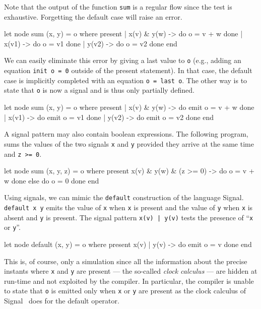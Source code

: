 \documentclass[11pt,titlepage,twoside]{report}
\newcommand{\signal}{{\sf Signal}}
\begin{document}
Note that the output of the function \verb-sum- is a regular flow
since the test is exhaustive. Forgetting the default case will raise
an error.
\begin{runverbatim}
let node sum (x, y) = o where
  present
  | x(v) & y(w) -> do o = v + w done
  | x(v1) -> do o = v1 done
  | y(v2) -> do o = v2 done
  end
\end{runverbatim}

We can easily eliminate this error by giving a last value to \verb-o-
(e.g., adding an equation \verb-init o = 0- outside of the present
statement). In that case, the default case is implicitly completed
with an equation \verb-o = last o-. The other way is to state that
\verb-o- is now a signal and is thus only partially defined.
\begin{runverbatim}[withresult]
let node sum (x, y) = o where
  present
  | x(v) & y(w) -> do emit o = v + w done
  | x(v1) -> do emit o = v1 done
  | y(v2) -> do emit o = v2 done
  end
\end{runverbatim}

A signal pattern may also contain boolean expressions. The following
program, sums the values of the two signals \verb-x- and \verb-y-
provided they arrive at the same time and \verb-z >= 0-.
\begin{runverbatim}
let node sum (x, y, z) = o where
  present
    x(v) & y(w) & (z >= 0) -> do o = v + w done
  else do o = 0 done
  end
\end{runverbatim}

\medskip{} Using signals, we can mimic the
\verb-default- construction of the language
\signal. \verb-default x y- emits the value of \verb-x- when \verb-x-
is present and the value of \verb-y- when \verb-x- is absent and
\verb-y- is present. The signal pattern \verb+x(v) | y(v)+ tests the
presence of ``\verb-x- or \verb-y-''.
\begin{runverbatim}
let node default (x, y) = o where
  present
    x(v) | y(v) -> do emit o = v done
  end
\end{runverbatim}
This is, of course, only a simulation since all the information about
the precise instants where \verb-x- and \verb-y- are present --- the
so-called \emph{clock calculus} --- are hidden at run-time and not exploited
by the compiler. In particular,
the compiler is unable to state that \verb-o- is emitted only when
\verb-x- or \verb-y- are present as the clock calculus of
\signal~\cite{signal:pldi} does for the default operator.
\end{document}
